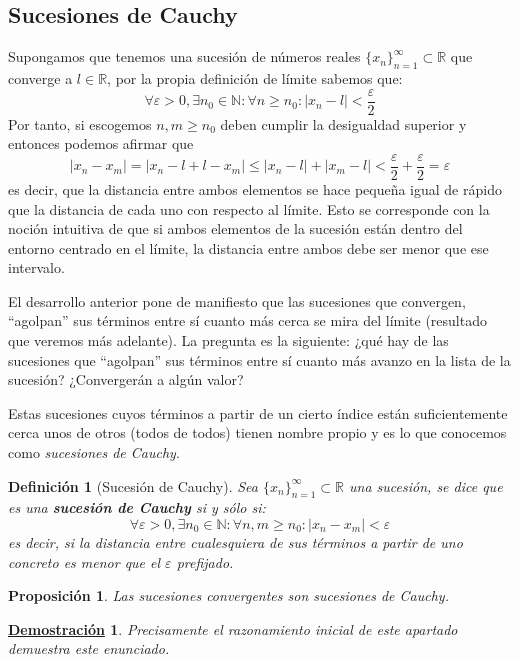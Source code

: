 \documentclass[10pt,a4paper,openright]{book}
\theoremstyle{break}
\newtheorem{defi}{Definición}[chapter]
\newtheorem{prop}{Proposición}[chapter]
\newtheorem*{demo}{\underline{Demostración}}
\begin{document}
\subsection{Sucesiones de Cauchy}
Supongamos que tenemos una sucesión de números reales $\{x_n\}_{n=1}^\infty\subset \mathbb R$ que converge a $l\in \mathbb R$, por la propia definición de límite sabemos que:
\[
\forall \varepsilon>0, \exists n_0\in \mathbb N: \forall n\geq n_0: |x_n-l|<\frac{\varepsilon}{2}
\]
Por tanto, si escogemos $n,m\geq n_0$ deben cumplir la desigualdad superior y entonces podemos afirmar que 
\[
|x_n-x_m|=|x_n-l+l-x_m|\leq |x_n-l|+|x_m-l|< \frac{\varepsilon}{2}+\frac{\varepsilon}{2}=\varepsilon
\]
es decir, que la distancia entre ambos elementos se hace pequeña igual de rápido que la distancia de cada uno con respecto al límite.  Esto se corresponde con la noción intuitiva de que si ambos elementos de la sucesión están dentro del entorno centrado en el límite, la distancia entre ambos debe ser menor que ese intervalo.

El desarrollo anterior pone de manifiesto que las sucesiones que convergen, ``agolpan'' sus términos entre sí cuanto más cerca se mira del límite (resultado que veremos más adelante). La pregunta es la siguiente: ¿qué hay de las sucesiones que ``agolpan'' sus términos entre sí cuanto más avanzo en la lista de la sucesión? ¿Convergerán a algún valor?

Estas sucesiones cuyos términos a partir de un cierto índice están suficientemente cerca unos de otros (todos de todos) tienen nombre propio y es lo que conocemos como \textit{sucesiones de Cauchy}.

\begin{defi}[Sucesión de Cauchy]
Sea $\{x_n\}_{n=1}^\infty\subset \mathbb R$ una sucesión, se dice que es una \textbf{sucesión de Cauchy} si y sólo si:
$$\forall \varepsilon>0, \exists n_0\in \mathbb N: \forall n,m\geq n_0: |x_n-x_m|<\varepsilon$$
es decir, si la distancia entre cualesquiera de sus términos a partir de uno concreto es menor que el $\varepsilon$ prefijado.
\end{defi}

\begin{prop}
Las sucesiones convergentes son sucesiones de Cauchy.
\end{prop}

\begin{demo}
Precisamente el razonamiento inicial de este apartado demuestra este enunciado.
\end{demo}
\end{document}
